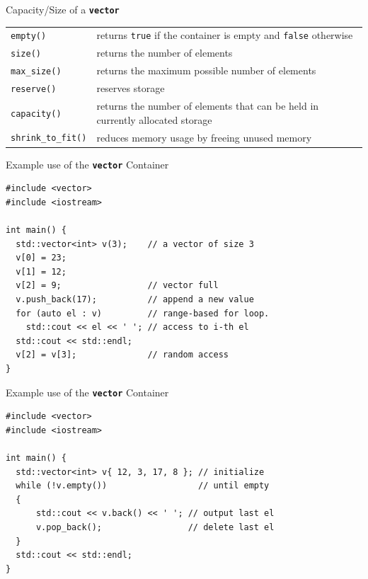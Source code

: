 \documentclass[14pt,aspectratio=1610]{beamer}
\begin{document}
\begin{frame}{Capacity/Size of a \texttt{\bfseries vector}}
\renewcommand{\arraystretch}{1.2}
\begin{tabularx}{1\textwidth}{l X}
\lstinline{empty()} &
  returns \lstinline{true} if the container is empty and \lstinline{false} otherwise \\
\lstinline{size()} &
  returns the number of elements\\
\lstinline{max_size()} &
  returns the maximum possible number of elements\\
\lstinline{reserve()} &
  reserves storage\\
\lstinline{capacity()} &
  returns the number of elements that can be held in currently allocated storage\\
\lstinline{shrink_to_fit()} &
  reduces memory usage by freeing unused memory\\
\end{tabularx}
\end{frame}

\begin{frame}[fragile]{Example use of the \texttt{\bfseries vector} Container}
  \small
\begin{lstlisting}
#include <vector>
#include <iostream>

int main() {
  std::vector<int> v(3);    // a vector of size 3
  v[0] = 23;
  v[1] = 12;
  v[2] = 9;                 // vector full
  v.push_back(17);          // append a new value
  for (auto el : v)         // range-based for loop.
    std::cout << el << ' '; // access to i-th el
  std::cout << std::endl;
  v[2] = v[3];              // random access
}
\end{lstlisting}
\end{frame}

\begin{frame}[fragile]{Example use of the \texttt{\bfseries vector} Container}
  \small
\begin{lstlisting}
#include <vector>
#include <iostream>

int main() {
  std::vector<int> v{ 12, 3, 17, 8 }; // initialize
  while (!v.empty())                  // until empty
  {
      std::cout << v.back() << ' '; // output last el
      v.pop_back();                 // delete last el
  }
  std::cout << std::endl;
}
\end{lstlisting}
\end{frame}
\end{document}

